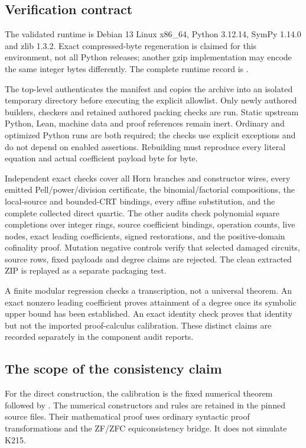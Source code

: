\documentclass[11pt]{article}
\begin{document}
\subsection{Verification contract}
The validated runtime is Debian 13 Linux x86\_64, Python 3.12.14,
SymPy 1.14.0 and zlib 1.3.2. Exact compressed-byte regeneration is claimed
for this environment, not all Python releases; another gzip implementation
may encode the same integer bytes differently. The complete runtime record
is .

The top-level  authenticates the manifest and copies the
archive into an isolated temporary directory before executing the explicit
 allowlist. Only newly authored builders, checkers and
retained authored packing checks are run. Static upstream Python, Lean,
machine data and proof references remain inert. Ordinary and optimized
Python runs are both required; the checks use explicit exceptions and do
not depend on enabled assertions. Rebuilding must reproduce every literal
equation and actual coefficient payload byte for byte.

Independent exact checks cover all Horn branches and constructor wires,
every emitted Pell/power/division certificate, the binomial/factorial
compositions, the local-source and bounded-CRT bindings, every affine
substitution, and the complete collected direct quartic. The other audits
check polynomial square completions over integer rings, source coefficient
bindings, operation counts, live nodes, exact leading coefficients, signed
restorations, and the positive-domain cofinality proof. Mutation negative
controls verify that selected damaged circuits, source rows, fixed payloads
and degree claims are rejected. The clean extracted ZIP is replayed as a
separate packaging test.

A finite modular regression checks a transcription, not a universal theorem.
An exact nonzero leading coefficient proves attainment of a degree once its
symbolic upper bound has been established. An exact identity check proves
that identity but not the imported proof-calculus calibration. These distinct
claims are recorded separately in the component audit reports.

\subsection{The scope of the consistency claim}
For the direct construction, the calibration is the fixed numerical theorem
 followed by
. The numerical
constructors and rules are retained in the pinned source files. Their
mathematical proof uses ordinary syntactic proof transformations and the
ZF/ZFC equiconsistency bridge. It does not simulate K215.
\end{document}
